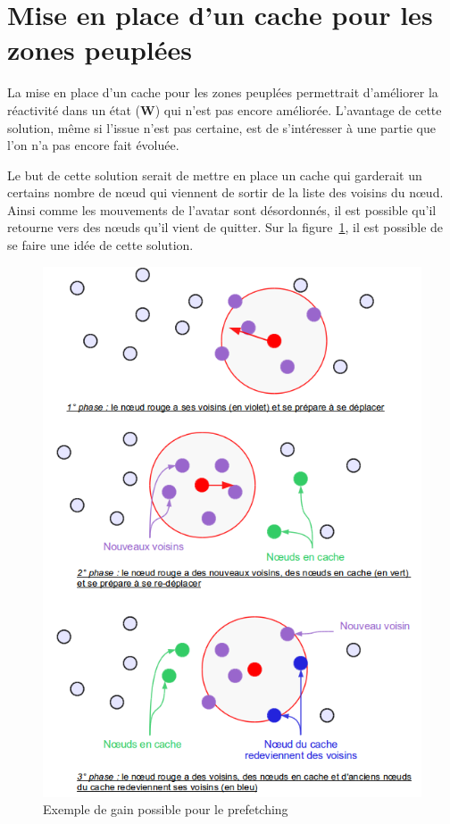 \documentclass[11pt,a4paper]{article}
\begin{document}
\section{Mise en place d'un cache pour les zones peuplées}
La mise en place d'un cache pour les zones peuplées permettrait d'améliorer la réactivité dans un état (\textbf{W}) qui n'est pas encore améliorée. L'avantage de cette solution, même si l'issue n'est pas certaine, est de s'intéresser à une partie que l'on n'a pas encore fait évoluée. 
\par Le but de cette solution serait de mettre en place un cache qui garderait un certains nombre de nœud qui viennent de sortir de la liste des voisins du nœud. Ainsi comme les mouvements de l'avatar sont désordonnés, il est possible qu'il retourne vers des nœuds qu'il vient de quitter. Sur la figure~\ref{cacheW}, il est possible de se faire une idée de cette solution.
	\begin{figure}[!h]
        \centering
        \includegraphics[scale=0.40]{./images/cacheW.png}
        \caption{Exemple de gain possible pour le prefetching}
        \label{cacheW}
        \end{figure} 
\end{document}
